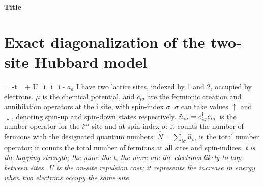 \documentclass[12pt]{article}
\begin{document}
\begin{titlepage}
\begin{center}
\bf{\Large{Title}}\\
\end{center}

\end{titlepage}

\tableofcontents
\newpage

\section{Exact diagonalization of the two-site Hubbard model}

\beq
\ham = -t\sum_\sigma{} + U\sum_i_{i\uparrow}_{i\downarrow} -\mu {}
\eeq
\(a_a\)
I have two lattice sites, indexed by 1 and 2, occupied by electrons. \(\mu\) is the chemical potential,  and \(c_{i\sigma}\) are the fermionic creation and annihilation operators at the i site, with spin-index \(\sigma\). \(\sigma\) can take values \(\uparrow\) and \(\downarrow\), denoting spin-up and spin-down states respectively. \(\hat{n}_{i\sigma}=c_{{i}{\sigma}}^\dagger c_{{i}{\sigma}}\) is the number operator for the \(i^{th}\) site and at spin-index \(\sigma\); it counts the number of fermions with the designated quantum numbers. \(\hat{N}= \sum_{i\sigma}\hat{n}_{i\sigma}\) is the total number operator; it counts the total number of fermions at all sites and spin-indices. \it t is the hopping strength; the more the t, the more are the electrons likely to hop between sites. \it U is the on-site repulsion cost; it represents the increase in energy when two electrons occupy the same site.
\end{document}
